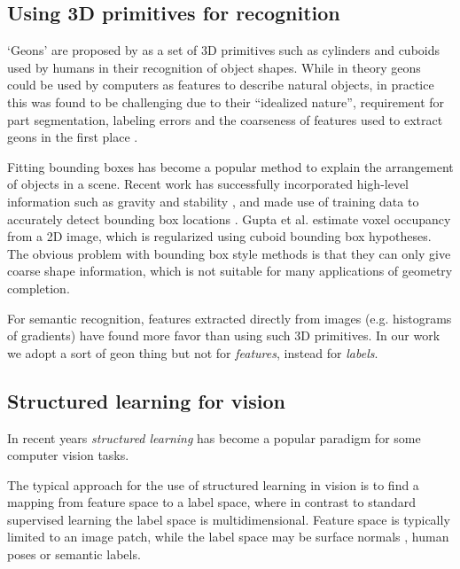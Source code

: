 \documentclass[10pt,twocolumn,letterpaper]{article}
\makeatletter
\renewcommand*{\eg}{e.g.\@\xspace}
\newcommand*{\ea}{et al.\@\xspace}
\makeatother
\begin{document}
\subsection{Using 3D primitives for recognition}

`Geons' are proposed by \cite{bieberman-rbc-1987} as a set of 3D primitives such as cylinders and cuboids used by humans in their recognition of object shapes.
While in theory geons could be used by computers  as features to describe natural objects, in practice this was found to be challenging due to their ``idealized nature'', requirement for part segmentation, labeling errors and the coarseness of features used to extract geons in the first place \cite{dickinson-iavc-1997}.

Fitting bounding boxes has become a popular method to explain the arrangement of objects in a scene.
Recent work has successfully incorporated high-level information such as gravity and stability
 \cite{shao-siggraphasia-2014, jia-cvpr-2013}, and made use of training data to accurately detect bounding box locations \cite{hedau-cvpr-2012}.
 Gupta \ea \cite{gupta-cvpr-2011} estimate voxel occupancy from a 2D image, which is regularized using cuboid bounding box hypotheses.
The obvious problem with bounding box style methods is that they can only give coarse shape information, which is not suitable for many applications of geometry completion.

For semantic recognition, features extracted directly from images (\eg histograms of gradients) have found more favor than using such 3D primitives.
In our work we adopt a sort of geon thing but not for \emph{features}, instead for \emph{labels}.

\subsection{Structured learning for vision}
In recent years \emph{structured learning} has become a popular paradigm for some computer vision tasks.

The typical approach for the use of structured learning in vision is to find a mapping from feature space to a label space, where in contrast to standard supervised learning the label space is multidimensional.
Feature space is typically limited to an image patch, while the label space may be surface normals \cite{fouhey-iccv-2013}, human poses \cite{bourdev-iccv-2009} or semantic labels.
\end{document}
